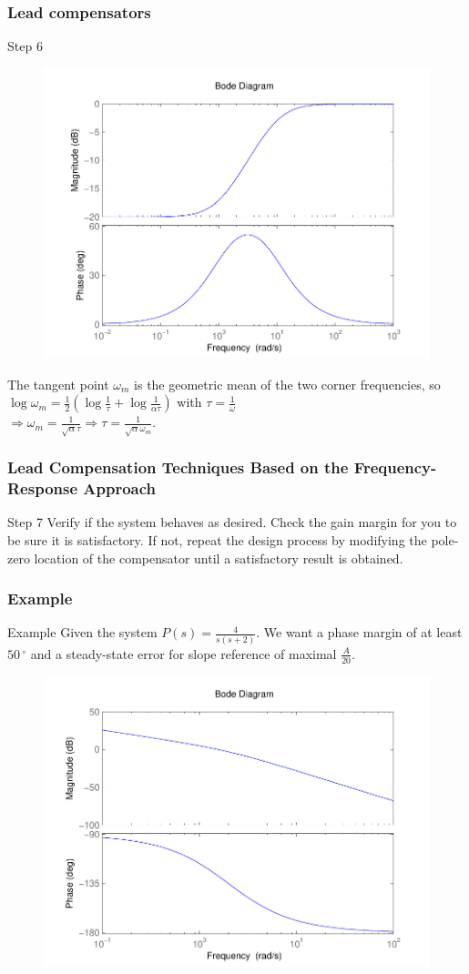 \begin{frame}
	\frametitle{Lead compensators}
	\begin{block}{Step 6}
		\begin{figure}
			\centering
			\includegraphics[width=0.5
			\linewidth]{bodelead}
		\end{figure}
		The tangent point $\omega_m$ is the geometric mean of the two corner frequencies, so
		$ \log \omega_m = \frac{1}{2}(\log \frac{1}{\tau} + \log \frac{1}{\alpha\tau})$ with $\tau = \frac{1}{\omega}$
		\\ $\Rightarrow \omega_m = \frac{1}{\sqrt{\alpha}\tau} \Rightarrow \tau = \frac{1}{\sqrt{\alpha}\omega_m}$. 
	\end{block}
\end{frame}

\begin{frame}
	\frametitle{Lead Compensation Techniques Based on the Frequency-Response Approach}
	\begin{block}{Step 7}
		Verify if the system behaves as desired.
		Check the gain margin for you to be sure it is satisfactory. If not, repeat the design process
		by modifying the pole-zero location of the compensator until a satisfactory result
		is obtained.
	\end{block}
\end{frame}

\begin{frame}
\frametitle{Example}
\begin{block}{Example}
	Given the system $P(s) = \frac{4}{s(s+2)}$. We want a phase margin of at least $50\,^{\circ}$ and a steady-state error for slope reference of maximal $\frac{A}{20}$.
	\begin{figure}
		\centering
		\includegraphics[width=0.5
		\linewidth]{bodeexamplelead}
	\end{figure}
\end{block}
\end{frame}


